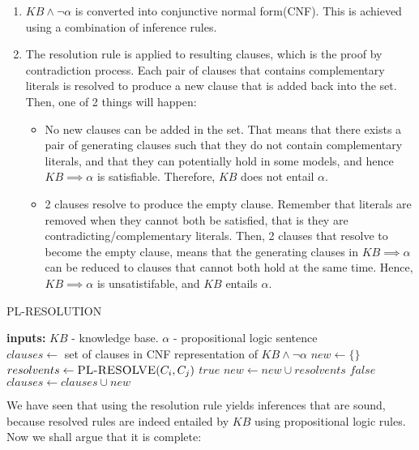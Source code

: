 \documentclass[12pt]{article}
\begin{document}
\begin{enumerate}
\item $KB \land \lnot \alpha$ is converted into conjunctive normal form(CNF). This is achieved using a combination of inference rules.
\item The resolution rule is applied to resulting clauses, which is the proof by contradiction process. Each pair of clauses that contains complementary literals is resolved to produce a new clause that is added back into the set. Then, one of 2 things will happen:
\begin{itemize}
\item No new clauses can be added in the set. That means that there exists a pair of generating clauses such that they do not contain complementary literals, and that they can potentially hold in some models, and hence $KB \implies \alpha$ is satisfiable. Therefore, $KB$ does not entail $\alpha$. 
\item 2 clauses resolve to produce the empty clause. Remember that literals are removed when they cannot both be satisfied, that is they are contradicting/complementary literals. Then, 2 clauses that resolve to become the empty clause, means that the generating clauses in $KB \implies \alpha$ can be reduced to clauses that cannot both hold at the same time. Hence,  $KB \implies \alpha$ is unsatistifable, and $KB$ entails $\alpha$.
\end{itemize}
\end{enumerate}

\begin{algorithm}
\caption{\textsc{PL-RESOLUTION}}\label{euclid}
\begin{algorithmic}[1]
\State \textbf{inputs:} $KB$ - knowledge base. $\alpha$ - propositional logic sentence
\\
\State $clauses \leftarrow $ set of clauses in CNF representation of $KB \land \lnot \alpha$
\State $new \leftarrow \{ \}$
\Repeat
{} 
\State $resolvents \leftarrow \textsc{PL-RESOLVE}(C_i, C_j)$
 \Return $true$
\EndIf
\State $new \leftarrow new \cup resolvents$
\EndFor
{} \Return $false$
\EndIf
\State $clauses \leftarrow clauses \cup new$
\end{algorithmic}
\end{algorithm}

We have seen that using the resolution rule yields inferences that are sound, because resolved rules are indeed entailed by $KB$ using propositional logic rules. Now we shall argue that it is complete:\\
\end{document}

